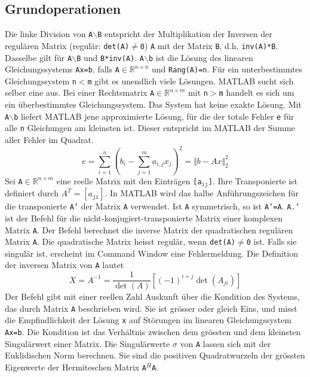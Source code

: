 \subsection{Grundoperationen}
Die linke Division \boxed{\textbf{\texttt{$\backslash$}}} von \texttt{A$\backslash$B} entspricht der Multiplikation der Inversen der regulären Matrix (regulär: \texttt{det(A)$\neq$0}) \texttt{A} mit der Matrix \texttt{B}, d.h. \texttt{inv(A)*B}. Dasselbe gilt für \texttt{A$\backslash$B} und \texttt{B*inv(A)}. \texttt{A$\backslash$b} ist die Lösung des linearen Gleichungssystems \texttt{Ax=b}, falls \texttt{A$\in\mathbb{R}^{n\times n}$} und \texttt{Rang(A)=n}. Für ein unterbestimmtes Gleichungssystem \texttt{n$<$m} gibt es unendlich viele Lösungen. MATLAB sucht sich selber eine aus. Bei einer Rechtsmatrix \texttt{A$\in\mathbb{R}^{n\times m}$} mit \texttt{n$>$m} handelt es sich um ein überbestimmtes Gleichungssystem. Das System hat keine exakte Lösung. Mit \texttt{A$\backslash$b} liefert MATLAB jene approximierte Lösung, für die der totale Fehler \texttt{e} für alle \texttt{n} Gleichungen am kleinsten ist. Dieser entspricht im MATLAB der Summe aller Fehler im Quadrat.
\begin{equation}
\boxed{e=\displaystyle \sum_{i=1}^n\left(b_i-\displaystyle \sum_{j=1}^m a_{i,j} x_j \right)^2=\Big\Vert b-Ax\Big\Vert_2^2}
\end{equation}
Sei \texttt{A$\in\mathbb{R}^{n\times m}$} eine reelle Matrix mit den Einträgen \texttt{[a$_{\texttt{ij}}$]}. Ihre Transponierte ist definiert durch \texttt{$A^T=[a_{\texttt{ji}}]$}. In MATLAB wird das halbe  Anführungszeichen für die transponierte \texttt{A'} der Matrix \texttt{A} verwendet. Ist \texttt{A} symmetrisch, so ist \texttt{A'=A}. \texttt{A.'} ist der Befehl für die nicht-konjugiert-transponierte Matrix einer komplexen Matrix \texttt{A}.
\newline\newline
Der Befehl  berechnet die inverse Matrix der quadratischen regulären Matrix \texttt{A}. Die quadratische Matrix heisst regulär, wenn \texttt{det(A)$\neq$0} ist. Falls sie singulär ist, erscheint im Command Window eine Fehlermeldung. Die Definition der inversen Matrix von \texttt{A} lautet
\begin{equation}
\boxed{X=A^{-1}=\dfrac{1}{\det(A)}[(-1)^{i+j}\det(A_{ji})]}
\end{equation}
Der Befehl  gibt mit einer reellen Zahl Auskunft über die Kondition des Systems, das durch Matrix \texttt{A} beschrieben wird. Sie ist grösser oder gleich Eins, und misst die Empfindlichkeit der Lösung \texttt{x} auf Störungen im linearen Gleichungssystem \texttt{Ax=b}. Die Kondition ist das Verhältnis zwischen dem grössten und dem kleinsten Singulärwert einer Matrix. Die Singulärwerte \texttt{$\sigma$} von \texttt{A} lassen sich mit der Euklidischen Norm berechnen. Sie sind die positiven Quadratwurzeln der grössten Eigenwerte der Hermiteschen Matrix \texttt{A$^H$A}.
